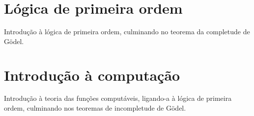 \documentclass{report}
\theoremstyle{definition}
\theoremstyle{remark}
\begin{document}
	
	\chapter{Lógica de primeira ordem}
	
	Introdução à lógica de primeira ordem, culminando no teorema da completude de Gödel.
	
	\chapter{Introdução à computação}
	
	Introdução à teoria das funções computáveis, ligando-a à lógica de primeira ordem, culminando nos teoremas de incompletude de Gödel.
	
\end{document}
